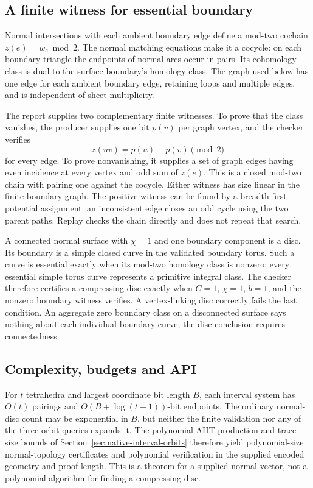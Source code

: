 \subsection{A finite witness for essential boundary}

Normal intersections with each ambient boundary edge define a mod-two
cochain $z(e)=w_e\bmod2$. The normal matching equations make it a cocycle:
on each boundary triangle the endpoints of normal arcs occur in pairs.
Its cohomology class is dual to the surface boundary's homology class.
The graph used below has one edge for each ambient boundary edge, retaining
loops and multiple edges, and is independent of sheet multiplicity.

The report supplies two complementary finite witnesses. To prove that the
class vanishes, the producer supplies one bit $p(v)$ per graph vertex, and
the checker verifies
\[
 z(uv)=p(u)+p(v)\pmod2
\]
for every edge. To prove nonvanishing, it supplies a set of graph edges
having even incidence at every vertex and odd sum of $z(e)$. This is a
closed mod-two chain with pairing one against the cocycle. Either witness
has size linear in the finite boundary graph. The positive witness can be
found by a breadth-first potential assignment: an inconsistent edge closes
an odd cycle using the two parent paths. Replay checks the chain directly
and does not repeat that search.

A connected normal surface with $\chi=1$ and one boundary component is a
disc. Its boundary is a simple closed curve in the validated boundary
torus. Such a curve is essential exactly when its mod-two homology class
is nonzero: every essential simple torus curve represents a primitive
integral class. The checker therefore certifies a compressing disc exactly
when $C=1$, $\chi=1$, $b=1$, and the nonzero boundary witness verifies.
A vertex-linking disc correctly fails the last condition. An aggregate
zero boundary class on a disconnected surface says nothing about each
individual boundary curve; the disc conclusion requires connectedness.

\subsection{Complexity, budgets and API}

For $t$ tetrahedra and largest coordinate bit length $B$, each interval
system has $O(t)$ pairings and $O(B+\log(t+1))$-bit endpoints. The ordinary
normal-disc count may be exponential in $B$, but neither the finite
validation nor any of the three orbit queries expands it. The polynomial
AHT production and trace-size bounds of
Section~\ref{sec:native-interval-orbits} therefore yield polynomial-size
normal-topology certificates and polynomial verification in the supplied
encoded geometry and proof length. This is a theorem for a supplied normal
vector, not a polynomial algorithm for finding a compressing disc.

